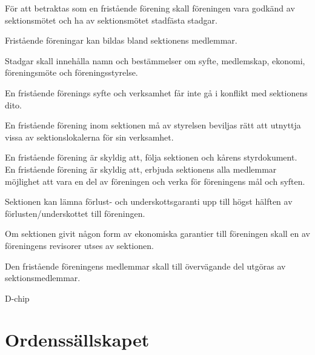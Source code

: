 \documentclass[stadgar]{dsekprotokoll}
\begin{document}
\begin{stadgeavsnitt}


För att betraktas som en fristående förening skall föreningen vara godkänd
av sektionsmötet och ha av sektionsmötet stadfästa stadgar.


Fristående föreningar kan bildas bland sektionens medlemmar.


Stadgar skall innehålla namn och bestämmelser om syfte, medlemskap,
ekonomi, föreningsmöte och föreningsstyrelse.


En fristående förenings syfte och verksamhet får inte gå i konflikt med
sektionens dito.


En fristående förening inom sektionen må av styrelsen beviljas rätt att
utnyttja vissa av sektionslokalerna för sin verksamhet.


En fristående förening är skyldig att, följa sektionen och kårens styrdokument. En fristående förening är skyldig att, erbjuda sektionens alla medlemmar möjlighet att vara en del av föreningen och verka för föreningens mål och syften.


Sektionen kan lämna förlust- och underskottsgaranti upp till högst hälften
av förlusten/underskottet till föreningen.


Om sektionen givit någon form av ekonomiska garantier till föreningen skall
en av föreningens revisorer utses av sektionen.


Den fristående föreningens medlemmar skall till övervägande del utgöras av
sektionsmedlemmar.

D-chip \\

\end{stadgeavsnitt}

\section{Ordenssällskapet}
\end{document}
